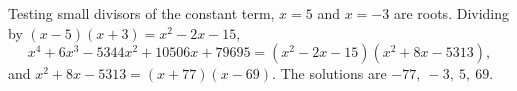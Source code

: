 Testing small divisors of the constant term, $x=5$ and $x=-3$ are roots. Dividing by $(x-5)(x+3)=x^2-2x-15$,
\[x^4+6x^3-5344x^2+10506x+79695=\left(x^2-2x-15\right)\left(x^2+8x-5313\right),\]
and $x^2+8x-5313=(x+77)(x-69)$. The solutions are $\boxed{-77,\ -3,\ 5,\ 69}$.
